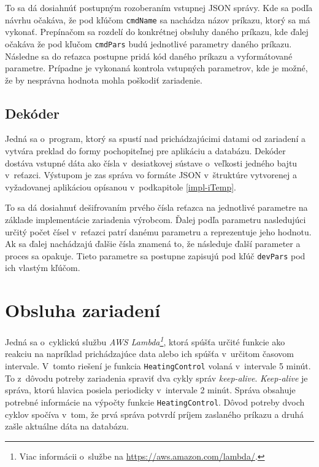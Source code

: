 To sa dá dosiahnúť postupným rozoberaním vstupnej JSON správy. Kde sa  podľa návrhu očakáva, že pod kľúčom \texttt{cmdName} sa nachádza názov príkazu, ktorý sa má vykonať. 
Prepínačom sa rozdelí do konkrétnej obsluhy daného príkazu, kde ďalej očakáva že pod kľučom \texttt{cmdPars} budú jednotlivé parametry daného príkazu. Následne sa do reťazca postupne pridá kód daného príkazu a vyformátované parametre. Prípadne je vykonaná kontrola vstupných parametrov, kde je možné, že by nesprávna hodnota mohla poškodiť zariadenie.

\subsection*{Dekóder}
Jedná sa o~program, ktorý sa spustí nad prichádzajúcimi datami od zariadení a vytvára preklad do formy pochopiteľnej pre aplikáciu a databázu. Dekóder dostáva vstupné dáta ako čísla v~desiatkovej sústave o~veľkosti jedného bajtu v~reťazci. Výstupom je zas správa vo formáte JSON v~štruktúre vytvorenej a vyžadovanej aplikáciou opísanou v~podkapitole \ref{impl-iTemp}.

To sa dá dosiahnuť dešifrovaním prvého čísla reťazca na jednotlivé parametre na základe implementácie zariadenia výrobcom. Ďalej podľa parametru nasledujúci určitý počet čísel v~reťazci patrí danému parametru a reprezentuje jeho hodnotu. Ak sa ďalej nachádzajú ďalšie čísla znamená to, že následuje ďalší parameter a proces sa opakuje. Tieto parametre sa postupne zapisujú pod kľúč \texttt{devPars} pod ich vlastým kľúčom.

\section{Obsluha zariadení}\label{impl-Lambda}
Jedná sa o~cyklickú službu \emph{AWS Lambda\footnote{Viac informácii o~službe na \url{https://aws.amazon.com/lambda/}.}}, ktorá spúšťa určité funkcie ako reakciu na napríklad prichádzajúce data alebo ich spúšťa v~určitom časovom intervale. V~tomto riešení je funkcia \texttt{HeatingControl} volaná v~intervale 5 minút. To z~dôvodu potreby zariadenia spraviť dva cykly správ \emph{keep-alive}. \emph{Keep-alive} je správa, ktorú hlavica posiela periodicky v~intervale 2 minút. Správa obsahuje potrebné informácie na výpočty funkcie \texttt{HeatingControl}. Dôvod potreby dvoch cyklov spočíva v~tom, že prvá správa potvrdí príjem zaslaného príkazu a druhá zašle aktuálne dáta na databázu.

